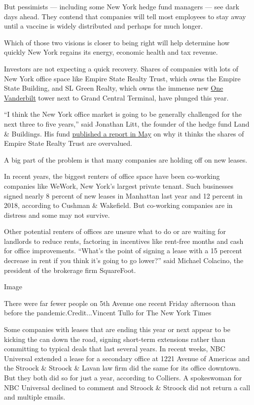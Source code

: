 But pessimists --- including some New York hedge fund managers --- see
dark days ahead. They contend that companies will tell most employees to
stay away until a vaccine is widely distributed and perhaps for much
longer.

Which of those two visions is closer to being right will help determine
how quickly New York regains its energy, economic health and tax
revenue.

Investors are not expecting a quick recovery. Shares of companies with
lots of New York office space like Empire State Realty Trust, which owns
the Empire State Building, and SL Green Realty, which owns the immense
new
\href{https://www.nytimes3xbfgragh.onion/2016/10/17/nyregion/tower-grand-central.html}{One
Vanderbilt} tower next to Grand Central Terminal, have plunged this
year.

``I think the New York office market is going to be generally challenged
for the next three to five years,'' said Jonathan Litt, the founder of
the hedge fund Land \& Buildings. His fund
\href{https://landandbuildings.com/wp-content/uploads/2020/05/LandB-NYC-Office-Facing-Existential-Hurricane-1.pdf}{published
a report in May} on why it thinks the shares of Empire State Realty
Trust are overvalued.

A big part of the problem is that many companies are holding off on new
leases.

In recent years, the biggest renters of office space have been
co-working companies like WeWork, New York's largest private tenant.
Such businesses signed nearly 8 percent of new leases in Manhattan last
year and 12 percent in 2018, according to Cushman \& Wakefield. But
co-working companies are in distress and some may not survive.

Other potential renters of offices are unsure what to do or are waiting
for landlords to reduce rents, factoring in incentives like rent-free
months and cash for office improvements. ``What's the point of signing a
lease with a 15 percent decrease in rent if you think it's going to go
lower?'' said Michael Colacino, the president of the brokerage firm
SquareFoot.

Image

There were far fewer people on 5th Avenue one recent Friday afternoon
than before the pandemic.Credit...Vincent Tullo for The New York Times

Some companies with leases that are ending this year or next appear to
be kicking the can down the road, signing short-term extensions rather
than committing to typical deals that last several years. In recent
weeks, NBC Universal extended a lease for a secondary office at 1221
Avenue of Americas and the Stroock \& Stroock \& Lavan law firm did the
same for its office downtown. But they both did so for just a year,
according to Colliers. A spokeswoman for NBC Universal declined to
comment and Stroock \& Stroock did not return a call and multiple
emails.

